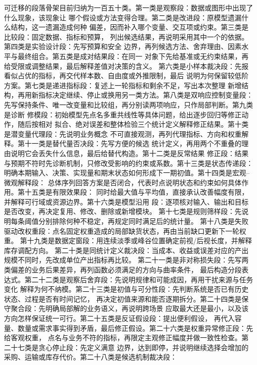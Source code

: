 可迁移的段落骨架目前归纳为一百五十类。第一类是观察段：数据或图形中出现了什么现象，该现象让
哪个假设或方法变得合理。第二类是改进段：原模型遗漏什么结构，这一遗漏造成何种
偏差，因而补入哪个变量、交互项或约束。第三类是比较段：固定数据、指标和预算，
列出候选结果，再说明采用其中一个的依据。第四类是实验设计段：先写预算和安全
边界，再列候选方法、舍弃理由、因素水平与最终组合。第五类是成对结果段：在同一
对象下先给基准或无约束结果，再给受限或调整结果，最后解释差值对决策的含义。
第六类是小样本裁决段：先报看似占优的指标，再交代样本数、自由度或外推限制，最后
说明为何保留较低阶方案。第七类是递进指标段：复述上一轮指标和剩余不足，写出本次整理
新增结构，再用新指标决定继续、停止或换用另一类方法。第八类是双响应控制变量段：
先写保持条件、唯一改变量和比较组，再分别读两项响应，只作局部判断。第九类是诊断
修模段：初始模型先点名多重共线性等具体问题，给出逐步回归等修正动作，随后按相对
拟合、绝对误差和整体检验三个统计定义解释修正结果。第十类是潜变量代理段：先说明业务概念
不可直接观测，再列代理指标、方向和权重解释。第十一类是替代量否决段：先写方便的候选
统计定义，再用两个不重叠的理由说明它会丢失什么信息，最后给替代构造。第十二类是反常结果
修正段：结果与预期不符时先诊断机制，只修改受影响的约束或系数。第十三类是状态传递段：
明确本期输入、决策、实现量和期末状态如何形成下一期初值。第十四类是宏观--微观解释段：
总体序列回答方案是否闭合，代表时点说明状态和约束如何具体作用。第十五类是有限效果段：
同时给最大值与平均值，直接承认改善幅度有限，并解释可行域或资源边界。第十六类是模型沿用
段：逐项核对输入、输出和目标是否改变，再决定复用、修改、删除或新增模块。
第十七类是规则筛样段：先说明每条阈值分别排除何种不稳定，再规定同时满足后的统计量。
第十八类是失败驱动改权重段：点名固定权重造成的局部缺货状态，再由当前缺口更新下一轮权重。
第十九类是数据定窗段：用连续淡季或峰谷位置确定前视/后视长度，并解释库存调配方向。
第二十类是同统计定义裁决段：当成本、收益或误差对应的产出规模不同时，先改成单位产出指标再比较。
第二十一类是非对称损失段：先写两类偏差的业务后果差异，再列函数必须满足的方向与曲率条件，
最后构造分段表达式。第二十二类是观察后舍弃段：先说明规律和可能成因，再用干扰来源与任务变化
解释为何不纳模。第二十三类是初值与可分性段：先判断系统是否已有历史状态、过程是否有时间记忆，
再决定初值来源和能否逐期拆分。第二十四类是保守聚合段：先明确局部解的业务语义，再说明跨场景
应取最大还是最小，以及该方向怎样保证统一可行。第二十五类是反证假设段：提出便利假设，
再代入容量、数量或需求事实得到矛盾，最后修正假设。第二十六类是权重异常修正段：先给客观权重，
点名与业务不符的指标，再限定主观修正幅度并做一致性检查。第二十七类是贪心停止段：先定义满意
边界，达到即停，并说明继续选择会增加的采购、运输或库存代价。第二十八类是候选机制裁决段：
